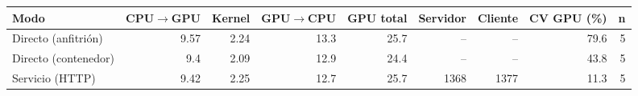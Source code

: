 \begin{tabular}{lrrrrrrrr}
\toprule
Modo & CPU$\to$GPU & Kernel & GPU$\to$CPU & GPU total & Servidor & Cliente & CV GPU (\%) & n \\
\midrule
Directo (anfitrión) & 9.57 & 2.24 & 13.3 & 25.7 & -- & -- & 79.6 & 5 \\
Directo (contenedor) & 9.4 & 2.09 & 12.9 & 24.4 & -- & -- & 43.8 & 5 \\
Servicio (HTTP) & 9.42 & 2.25 & 12.7 & 25.7 & 1368 & 1377 & 11.3 & 5 \\
\bottomrule
\end{tabular}
